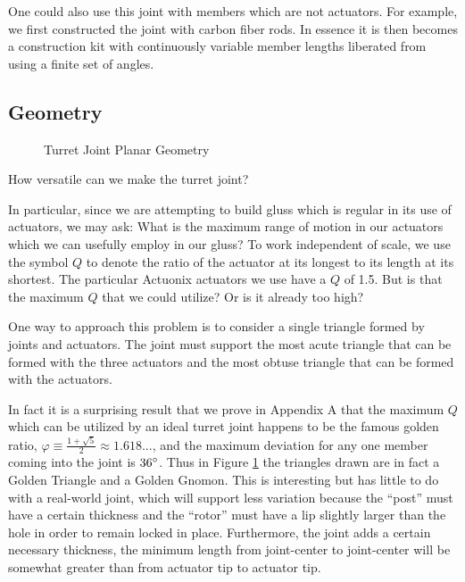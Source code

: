 \documentclass[11pt]{article}
\begin{document}
One could also use this joint with members which are not actuators. For example, we first
constructed the joint with carbon fiber rods. In essence it is then becomes a construction kit with continuously
variable member lengths liberated from using a finite set of angles.

\subsection{Geometry}

\begin{figure}[!ht]
  \centering
    \caption[Turret Joint Planar Geometry]{Turret Joint Planar Geometry}
      \label{simplified-constraint-drawing}
\end{figure}

How versatile can we make the turret joint?

In particular, since we are attempting to build gluss which is regular in its use of actuators, we may ask:
What is the maximum range of motion in our
actuators which we can usefully employ in our gluss?
To work independent of scale, we use the symbol $Q$ to denote the ratio of the actuator at its
longest to its length at its shortest.
The particular Actuonix actuators we use have a $Q$ of 1.5. But is that the maximum $Q$ that we could utilize? Or is
it already too high?

One way to approach this problem is to consider a single triangle formed by joints and actuators.
The joint must support the most acute triangle
that can be formed with the three actuators and the most obtuse triangle that can be formed with the actuators.

In fact it is a surprising result that we prove in Appendix A that the maximum $Q$ which can be utilized
by an ideal turret joint happens to be
the famous golden ratio, $\varphi \equiv \frac{1 + \sqrt{5}}{2} \approx 1.618...$, and the maximum deviation for any one member coming
into the joint is $36\degree$.
Thus in Figure \ref{simplified-constraint-drawing} the triangles drawn are in fact a Golden Triangle and a Golden Gnomon.
This is interesting but has little to
do with a real-world joint, which will support less variation because the ``post'' must have a
certain thickness and the ``rotor'' must have a lip
slightly larger than the hole in order to remain locked in place.
Furthermore, the joint adds a certain necessary thickness, the minimum length
 from joint-center to joint-center will be somewhat greater than from actuator tip to actuator tip.
\end{document}
